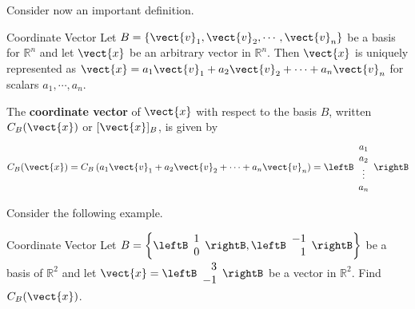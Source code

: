 Consider now an important definition.

 
\begin{definition}{Coordinate Vector}\label{def:coordinatevector}
Let $B = \left\{ \vect{v}_1, \vect{v}_2, \cdots, \vect{v}_n \right\}$
be a basis for $\mathbb{R}^n$ and let $\vect{x}$ be an arbitrary
vector in $\mathbb{R}^n$. Then $\vect{x}$ is uniquely represented as
$\vect{x} = a_1\vect{v}_1 +
a_2\vect{v}_2 + \cdots + a_n\vect{v}_n$ for scalars $a_1, \cdots,
a_n$. 

The  \textbf{coordinate vector} of $\vect{x}$ with respect to the
basis $B$, written $C_B(\vect{x})$ or  $[\vect{x}]_B$,  is given by 
\[
C_B(\vect{x}) =  C_B \left( a_1\vect{v}_1 + a_2\vect{v}_2 + \cdots + a_n\vect{v}_n \right) = \leftB
\begin{array}{c}
a_1 \\
a_2 \\
\vdots \\
a_n
\end{array} \rightB
\] 
\end{definition}

Consider the following example.

\begin{example}{Coordinate Vector}\label{exa:coordinatevector}
Let $B = \left\{ \leftB \begin{array}{r}
1 \\
0 
\end{array} \rightB, \leftB \begin{array}{r}
-1 \\
1
\end{array} \rightB \right\}$ be a basis of $\mathbb{R}^2$ and let $\vect{x} = \leftB
\begin{array}{r}
3 \\
-1
\end{array}
\rightB$ be a vector in $\mathbb{R}^2$. Find $C_B(\vect{x})$. 
\end{example}

